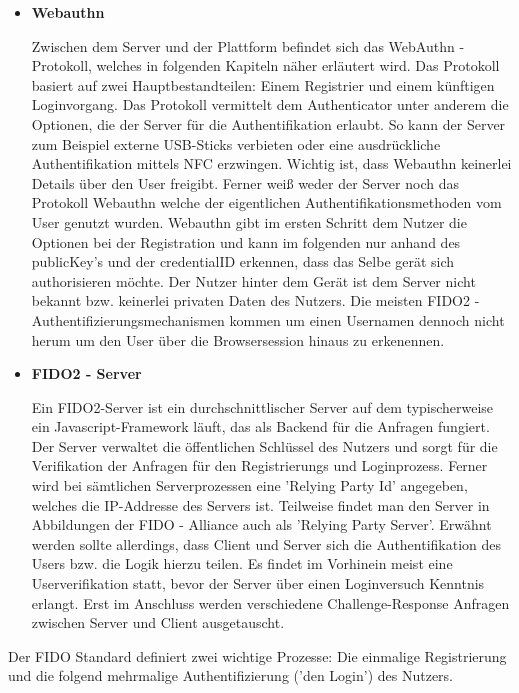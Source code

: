 \begin{itemize}
\item \textbf{Webauthn}

Zwischen dem Server und der Plattform befindet sich das WebAuthn - Protokoll, welches in folgenden Kapiteln näher erläutert wird. Das Protokoll basiert auf zwei Hauptbestandteilen: Einem Registrier und einem künftigen Loginvorgang. Das Protokoll vermittelt dem Authenticator unter anderem die Optionen, die der Server für die Authentifikation erlaubt. So kann der Server zum Beispiel externe USB-Sticks verbieten oder eine ausdrückliche Authentifikation mittels NFC erzwingen. Wichtig ist, dass Webauthn keinerlei Details über den User freigibt. Ferner weiß weder der Server noch das Protokoll Webauthn welche der eigentlichen Authentifikationsmethoden vom User genutzt wurden. Webauthn gibt im ersten Schritt dem Nutzer die Optionen bei der Registration und kann im folgenden nur anhand des publicKey's und der credentialID erkennen, dass das Selbe gerät sich authorisieren möchte. Der Nutzer hinter dem Gerät ist dem Server nicht bekannt bzw. keinerlei privaten Daten des Nutzers. Die meisten FIDO2 - Authentifizierungsmechanismen kommen um einen Usernamen dennoch nicht herum um den User über die Browsersession hinaus zu erkenennen.

\item \textbf{FIDO2 - Server}

Ein FIDO2-Server ist ein durchschnittlischer Server auf dem typischerweise ein Javascript-Framework läuft, das als Backend für die Anfragen fungiert. Der Server verwaltet die öffentlichen Schlüssel des Nutzers und sorgt für die Verifikation der Anfragen für den Registrierungs und Loginprozess. Ferner wird bei sämtlichen Serverprozessen eine 'Relying Party Id' angegeben, welches die IP-Addresse des Servers ist. Teilweise findet man den Server in Abbildungen der FIDO - Alliance auch als 'Relying Party Server'. Erwähnt werden sollte allerdings, dass Client und Server sich die Authentifikation des Users bzw. die Logik hierzu teilen. Es findet im Vorhinein meist eine Userverifikation statt, bevor der Server über einen Loginversuch Kenntnis erlangt. Erst im Anschluss werden verschiedene Challenge-Response Anfragen zwischen Server und Client ausgetauscht.

\end{itemize}

\newpage

Der FIDO Standard definiert zwei wichtige Prozesse: Die einmalige Registrierung und die folgend mehrmalige Authentifizierung ('den Login') des Nutzers.

